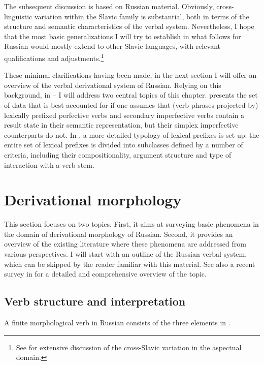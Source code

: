 \documentclass[output=paper,colorlinks,citecolor=brown]{langscibook}
\begin{document}
The subsequent discussion is based on %
Russian material. Obviously, cross-lin\-guis\-tic variation within the Slavic family is substantial, both in terms of the structure and semantic characteristics of the verbal system. Nevertheless, I hope that the most basic generalizations I will try to establish in what follows for Russian would mostly extend to other Slavic languages, with relevant qualifications and adjustments.\footnote{See  for extensive discussion of the cross-Slavic variation in the aspectual domain.}

These minimal clarifications having been made, in the next section I will offer an overview of the verbal derivational system of Russian. Relying on this background, in -- I will address two central topics of this chapter.  presents the set of data that is best accounted for if one assumes that (verb phrases projected by) lexically prefixed perfective verbs and secondary imperfective verbs contain a result state in their semantic representation, but their simplex imperfective counterparts do not. In , a more detailed typology of lexical prefixes is set up: the entire set of lexical prefixes is divided into subclasses defined by a number of criteria, including their compositionality, argument structure and type of interaction with a verb stem. 

\section{Derivational morphology}\label{sec:1}
\hypertarget{RefHeadingToc164647616}{}
This section focuses on two topics. First, it aims at surveying basic phenomena in the domain of derivational morphology of Russian. Second, it provides an overview of the existing literature where these phenomena are addressed from various perspectives. I will start with an outline of the Russian verbal system, which can be skipped by the reader familiar with this material. See also a recent survey in \citet{Borik2024} for a detailed and comprehensive overview of the topic. 

\subsection{Verb structure and interpretation}\label{sec:1.1}
\hypertarget{RefHeadingToc164647617}{}
A finite morphological verb in Russian  consists of the three elements in . 
\end{document}
